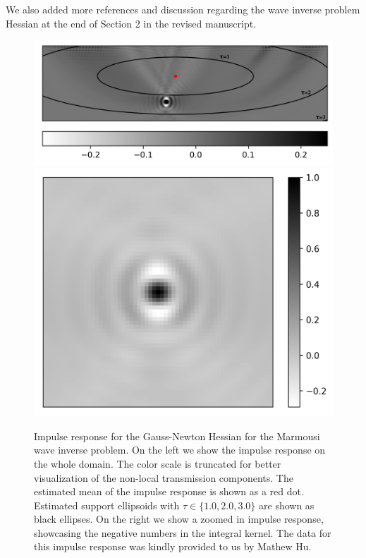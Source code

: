 \documentclass[11pt]{article}
\newcommand{\+}{\otimes}
\begin{document}
\begin{enumerate}
{	We also added more references and discussion regarding the wave inverse problem Hessian at the end of Section 2 in the revised manuscript.
	
	\begin{figure}
		\centering
		\includegraphics[scale=0.735]{marmousi_impulse_response_full_domain_ellipsoid_with_tau_annotations.png}
		\includegraphics[scale=0.3975]{marmousi_impulse_response_zoomed_in.png}
		
		\caption{Impulse response for the Gauss-Newton Hessian for the Marmousi wave inverse problem. On the left we show the impulse response on the whole domain. The color scale is truncated for better visualization of the non-local transmission components. The estimated mean of the impulse response is shown as a red dot. Estimated support ellipsoids with $\tau\in \{1.0, 2.0, 3.0\}$  are shown as black ellipses. On the right we show a zoomed in impulse response, showcasing the negative numbers in the integral kernel. The data for this impulse response was kindly provided to us by Mathew Hu.
		}
		\label{fig:marmousi_impulse}
	\end{figure}
	
}
\end{enumerate}
\end{document}
